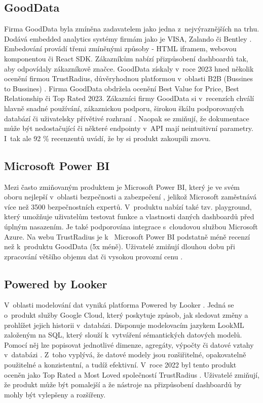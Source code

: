 \documentclass[czech, bc, kiv, he, iso690numb, viewonly]{fasthesis} %
\begin{document}
\subsection{GoodData}
Firma GoodData byla zmíněna zadavatelem jako jedna z~nejvýraznějších na trhu. Dodává embedded analytics systémy firmám jako je VISA, Zalando či Bentley \cite{goodDataEmbeddingPlatform}. 
Embedování provádí třemi zmíněnými způsoby - HTML iframem, webovou komponentou či React SDK. Zákazníkům nabízí přizpůsobení dashboardů tak, aby odpovídaly zákazníkově značce. GoodData získaly
v~roce 2023 hned několik ocenění firmou TrustRadius, důvěryhodnou platformou v~oblasti B2B (Bussines to Bussines) \cite{trustRadiusDiscusionGoodData}. Firma GoodData obdržela ocenění Best Value for Price,
Best Relationship či Top Rated 2023. Zákazníci firmy GoodData si v~recenzích chválí hlavně snadné používání, zákaznickou podporu, širokou škálu podporovaných databází či uživatelsky přívětivé
rozhraní \cite{trustRadiusDiscusionGoodData}. Naopak se zmiňují, že dokumentace může být nedostačující či některé endpointy v~API mají neintuitivní parametry. I~tak ale 92 \% recenzentů uvádí,
že by si produkt zakoupili znovu.

\subsection{Microsoft Power BI}
Mezi často zmiňovaným produktem je Microsoft Power BI, který je ve svém oboru nejlepší v~oblasti bezpečnosti a zabezpečení \cite{bestEmbTools2023},
jelikož Microsoft zaměstnává více než 3500 bezpečnostních expertů. V~produktu nabízí také tzv. playground, který
umožňuje uživatelům testovat funkce a vlastnosti daných dashboardů před úplným nasazením. Je také podporována integrace s~cloudovou službou Microsoft Azure. Na webu TrustRadius je k~
Microsoft Power BI podstatně méně recenzí než k~produktu GoodData (5x méně). Uživatelé zmiňují dlouhou dobu při zpracování většího objemu dat či vysokou provozní cenu \cite{trustRadiusDiscusionAzure}.

\subsection{Powered by Looker}
V~oblasti modelování dat vyniká platforma Powered by Looker \cite{bestEmbTools2023}. Jedná se o~produkt služby Google Cloud, který poskytuje způsob, jak sledovat změny a prohlížet jejich
historii v~databázi. Disponuje modelovacím jazykem LookML založeným na SQL, který slouží k~vytváření sémantických datových modelů. Pomocí něj lze popisovat jednotlivé dimenze, agregáty,
výpočty či datové vztahy v~databázi \cite{googleLookMLDoc}. Z~toho vyplývá, že datové modely jsou rozšiřitelné, opakovatelně použitelné a konzistentní, a tudíž efektivní. V~roce 2022 byl tento produkt
oceněn jako Top Rated a Most Loved společností TrustRadius \cite{trustRadiusDiscusionLooker}. Uživatelé zmiňují, že produkt může být pomalejší a že nástroje na přizpůsobení dashboardů by mohly být
vylepšeny a rozšířeny.
\end{document}
